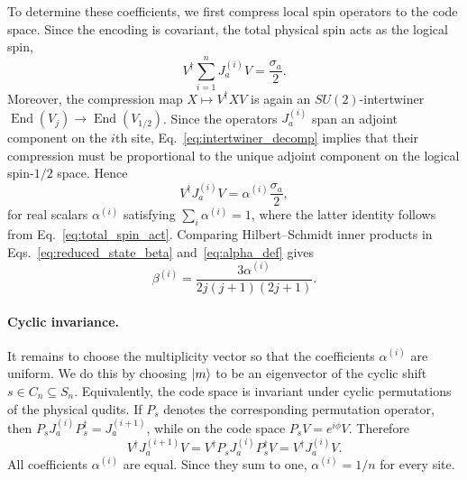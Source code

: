 \documentclass[10pt,twocolumn,superscriptaddress,aps,amsmath,amssymb,citeautoscript,floatfix,prx]{revtex4-2}
\theoremstyle{plain}
\theoremstyle{plain}
\theoremstyle{plain}
\theoremstyle{plain}
\theoremstyle{plain}
\theoremstyle{plain}
\begin{document}
To determine these coefficients, we first compress local spin operators to the code space. Since the encoding is covariant, the total physical spin acts as the logical spin,
\begin{equation}\label{eq:total_spin_act}
    V^\dagger \sum_{i=1}^n J_a^{(i)} V
    =
    \frac{\sigma_a}{2} .
\end{equation}
Moreover, the compression map $X\mapsto V^\dagger X V$ is again an $SU(2)$-intertwiner $\operatorname{End}(V_j)\rightarrow \operatorname{End}(V_{1/2})$. Since the operators $J_a^{(i)}$ span an adjoint component on the $i$th site, Eq.~\eqref{eq:intertwiner_decomp} implies that their compression must be proportional to the unique adjoint component on the logical spin-$1/2$ space. Hence
\begin{equation}\label{eq:alpha_def}
    V^\dagger J_a^{(i)} V
    =
    \alpha^{(i)}\frac{\sigma_a}{2},
\end{equation}
for real scalars $\alpha^{(i)}$ satisfying $\sum_i\alpha^{(i)}=1$, where the latter identity follows from Eq.~\eqref{eq:total_spin_act}. Comparing Hilbert--Schmidt inner products in Eqs.~\eqref{eq:reduced_state_beta} and~\eqref{eq:alpha_def} gives
\begin{equation}\label{eq:beta_through_alpha}
    \beta^{(i)}
    =
    \frac{3\alpha^{(i)}}{2j(j+1)(2j+1)} .
\end{equation}

\paragraph{Cyclic invariance.}
It remains to choose the multiplicity vector so that the coefficients $\alpha^{(i)}$ are uniform. We do this by choosing $\ket m$ to be an eigenvector of the cyclic shift $s\in C_n\subseteq S_n$. Equivalently, the code space is invariant under cyclic permutations of the physical qudits. If $P_s$ denotes the corresponding permutation operator, then $P_s J_a^{(i)}P_s^\dagger=J_a^{(i+1)}$, while on the code space $P_sV=e^{i\phi}V$. Therefore
\[
    V^\dagger J_a^{(i+1)}V
    =
    V^\dagger P_sJ_a^{(i)}P_s^\dagger V
    =
    V^\dagger J_a^{(i)}V .
\]
All coefficients $\alpha^{(i)}$ are equal. Since they sum to one, $\alpha^{(i)}=1/n$ for every site.
\end{document}

